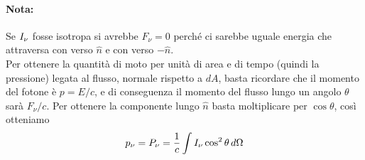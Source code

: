 \paragraph{Nota:} Se $I_\nu$ fosse isotropa si avrebbe $F_\nu=0$ perché ci sarebbe uguale energia che attraversa con verso $\hat{n}$ e con verso $-\hat{n}$.\\
Per ottenere la quantità di moto per unità di area e di tempo (quindi la pressione) legata al flusso, normale rispetto a $dA$, basta ricordare che il momento del fotone è $p=E/c$, e di conseguenza il momento del flusso lungo un angolo $\theta$ sarà $F_\nu/c$. Per ottenere la componente lungo $\hat{n}$ basta moltiplicare per $\cos \theta$, così otteniamo
\begin{equation*}
    p_\nu = P_\nu = \frac{1}{c}\int I_\nu\cos^2\theta\, d\Omega
\end{equation*}


